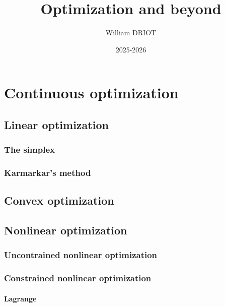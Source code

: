 \documentclass[12pt,openany,oneside]{book}
\title{\textbf{Optimization and beyond}}
\author{William DRIOT}
\date{2025-2026}
\theoremstyle{definition}
\numberwithin{definition}{section}
\numberwithin{theorem}{section}
\numberwithin{corollary}{section}
\numberwithin{proposition}{section}
\numberwithin{notation}{section}
\numberwithin{remark}{section}
\numberwithin{hypothesis}{section}
\begin{document}
\maketitle

\tableofcontents

\setlength{\parindent}{15pt}
\setlength{\parskip}{6pt}

\newpage


% 
% 
% 
% 

\part{Continuous optimization}

\chapter{Linear optimization}

\section{The simplex}


\section{Karmarkar's method}

\chapter{Convex optimization}

\chapter{Nonlinear optimization}

\section{Uncontrained nonlinear optimization}
\section{Constrained nonlinear optimization}
\subsection{Lagrange}
\end{document}
